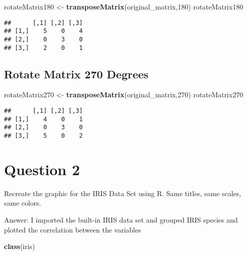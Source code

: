 \documentclass{article}
\newenvironment{Shaded}{\begin{snugshade}}{\end{snugshade}}
\newcommand{\DecValTok}[1]{\textcolor[rgb]{0.00,0.00,0.81}{#1}}
\newcommand{\KeywordTok}[1]{\textcolor[rgb]{0.13,0.29,0.53}{\textbf{#1}}}
\newcommand{\NormalTok}[1]{#1}
\newcommand{\StringTok}[1]{\textcolor[rgb]{0.31,0.60,0.02}{#1}}
\begin{document}
\begin{Shaded}
\begin{Highlighting}[]
\NormalTok{rotateMatrix180 <-}\StringTok{ }\KeywordTok{transposeMatrix}\NormalTok{(original_matrix,}\DecValTok{180}\NormalTok{)}
\NormalTok{rotateMatrix180}
\end{Highlighting}
\end{Shaded}

\begin{verbatim}
##      [,1] [,2] [,3]
## [1,]    5    0    4
## [2,]    0    3    0
## [3,]    2    0    1
\end{verbatim}

\hypertarget{rotate-matrix-270-degrees}{%
\subsection{\texorpdfstring{\textbf{Rotate Matrix 270
Degrees}}{Rotate Matrix 270 Degrees}}\label{rotate-matrix-270-degrees}}

\begin{Shaded}
\begin{Highlighting}[]
\NormalTok{rotateMatrix270 <-}\StringTok{ }\KeywordTok{transposeMatrix}\NormalTok{(original_matrix,}\DecValTok{270}\NormalTok{)}
\NormalTok{rotateMatrix270}
\end{Highlighting}
\end{Shaded}

\begin{verbatim}
##      [,1] [,2] [,3]
## [1,]    4    0    1
## [2,]    0    3    0
## [3,]    5    0    2
\end{verbatim}

\newpage

\hypertarget{question-2}{%
\section{\texorpdfstring{\textbf{Question
2}}{Question 2}}\label{question-2}}

Recreate the graphic for the IRIS Data Set using R. Same titles, same
scales, same colors.

Answer: I imported the built-in IRIS data set and grouped IRIS species
and plotted the correlation between the variables

\begin{Shaded}
\begin{Highlighting}[]
\KeywordTok{class}\NormalTok{(iris)}
\end{Highlighting}
\end{Shaded}
\end{document}
